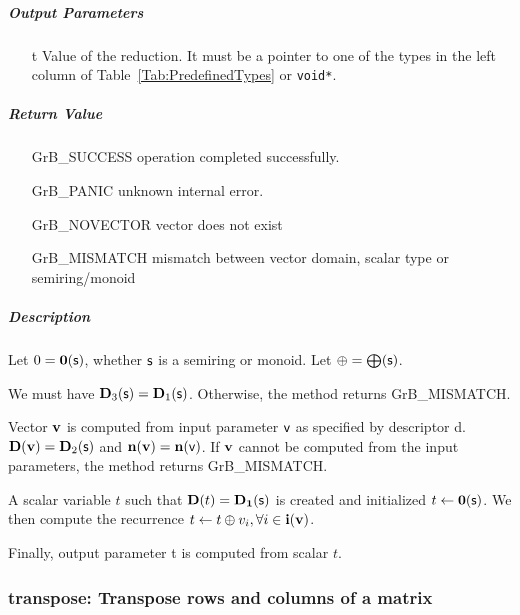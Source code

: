 \subparagraph{Output Parameters}

\begin{itemize}
    \item[{\sf t}] Value of the reduction. It must
    be a pointer to one of the types in 
    the left column of Table~\ref{Tab:PredefinedTypes} or
    {\tt void*}.
\end{itemize}

\subparagraph{Return Value}

\begin{itemize}[leftmargin=2.1in]
\item[{\sf GrB\_SUCCESS}]     operation completed successfully.
\item[{\sf GrB\_PANIC}]        unknown internal error.
\item[{\sf GrB\_NOVECTOR}]    vector does not exist
\item[{\sf GrB\_MISMATCH}]    mismatch between vector domain, scalar type or semiring/monoid
\end{itemize}

\subparagraph{Description}

Let $0 = \bold{0}({\sf s})$, whether ${\sf s}$ is a semiring or monoid.
Let $\oplus = \bigoplus({\sf s})$.

We must have $\bold{D}_3({\sf s}) = \bold{D}_1({\sf s})$.
Otherwise, the method returns {\sf GrB\_MISMATCH}.

Vector ${\bf v}$ is computed from input parameter ${\sf v}$ as
specified by descriptor {\sf d}. $\bold{D}({\bf v}) = \bold{D}_2({\sf s})$
and $\bold{n}({\bf v}) = \bold{n}({\sf v})$. If ${\bf v}$ cannot be computed
from the input parameters, the method returns {\sf GrB\_MISMATCH}.

A scalar variable $t$ such that $\bold{D}(t) = \bold{D_1}({\sf s})$ is
created and initialized $t \leftarrow \bold{0}({\sf s})$. 
We then compute the recurrence $t \leftarrow t \oplus v_i, \forall i \in {\bf i}({\bf v})$.

Finally, output parameter {\sf t} is computed from scalar $t$.


\subsubsection{{\sf transpose}: Transpose rows and columns of a matrix}


